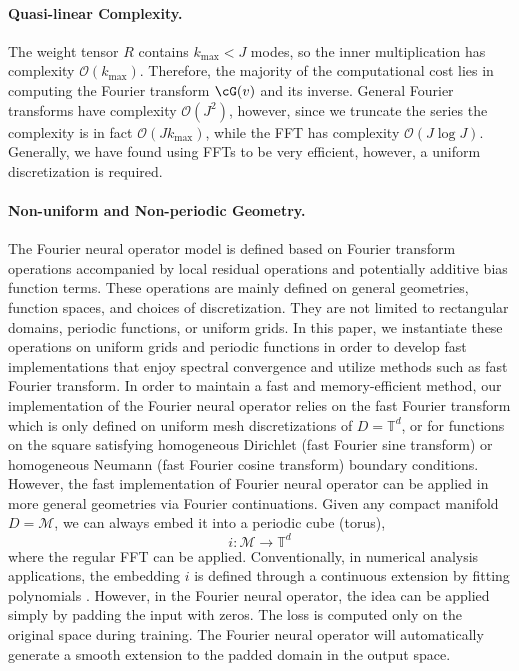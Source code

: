 
\paragraph{Quasi-linear Complexity.}
The weight tensor $R$ contains $k_{\text{max}} < J$ modes, so the inner multiplication has complexity $\mathcal{O}(k_{\text{max}})$. Therefore, the majority of the computational cost lies in computing the Fourier transform $\cG(v)$ and its inverse. General Fourier transforms have complexity $\mathcal{O}(J^2)$, however, since we truncate the series the complexity is in fact $\mathcal{O}(J k_{\text{max}})$, while the FFT has complexity $\mathcal{O}(J \log J)$. Generally, we have found using FFTs to be very efficient, however, a uniform discretization is required. 


\paragraph{Non-uniform and Non-periodic Geometry.}
The Fourier neural operator model is defined based on Fourier transform operations accompanied by local residual operations and potentially additive bias function terms. These operations are mainly defined on general geometries, function spaces, and choices of discretization. They are not limited to rectangular domains, periodic functions, or uniform grids. In this paper, we instantiate these operations on uniform grids and periodic functions in order to develop fast implementations that enjoy spectral convergence and utilize methods such as fast Fourier transform. In order to maintain a fast and memory-efficient method, our implementation of the Fourier neural operator relies on the fast Fourier transform which is only defined on uniform mesh discretizations of \(D = \mathbb{T}^d\), or for functions on the square satisfying homogeneous Dirichlet (fast Fourier sine transform) or
homogeneous Neumann (fast Fourier cosine transform) boundary conditions.
However, the fast implementation of Fourier neural operator  can be applied in more general geometries via Fourier continuations. Given any compact manifold $D = \mathcal{M}$, we can always embed it into a periodic cube (torus), 
\[i: \mathcal{M} \to \mathbb{T}^d\]
where the regular FFT can be applied. Conventionally, in numerical analysis
applications, the embedding $i$ is defined through a continuous extension by fitting polynomials \citep{bruno2007accurate}. However, in the Fourier neural operator, the idea can be applied simply by padding the input with zeros. The loss is computed only on the original space during training. The Fourier neural operator will automatically generate a smooth extension to the padded domain in the output space.
